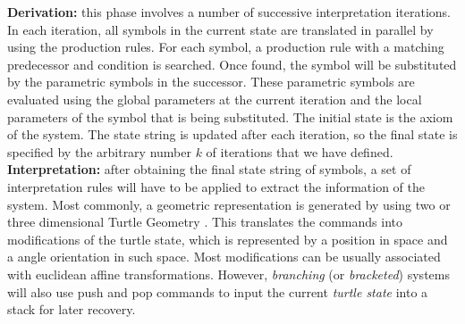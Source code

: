 \documentclass[letterpaper,twoside,11pt]{article}
\begin{document}
\begin{multicols}{2}
\textbf{Derivation:} this phase involves a number of successive interpretation iterations. In each iteration, all symbols in the current state are translated in parallel by using the production rules. For each symbol, a production rule with a matching predecessor and condition is searched. Once found, the symbol will be substituted by the parametric symbols in the successor. These parametric symbols are evaluated using the global parameters at the current iteration and the local parameters of the symbol that is being substituted. The initial state is the axiom of the system. The state string is updated after each iteration, so the final state is specified by the arbitrary number $k$ of iterations that we have defined.
\vfill
\columnbreak
\textbf{Interpretation:} after obtaining the final state string of symbols, a set of interpretation rules will have to be applied to extract the information of the system. Most commonly, a geometric representation is generated by using two or three dimensional Turtle Geometry \cite{abelson1986turtle}. This translates the commands into modifications of the turtle state, which is represented by a position in space and a angle orientation in such space. Most modifications can be usually associated with euclidean affine transformations. However, \emph{branching} (or \emph{bracketed}) systems will also use push and pop commands to input the current \emph{turtle state} into a stack for later recovery.


\end{multicols}
\end{document}
